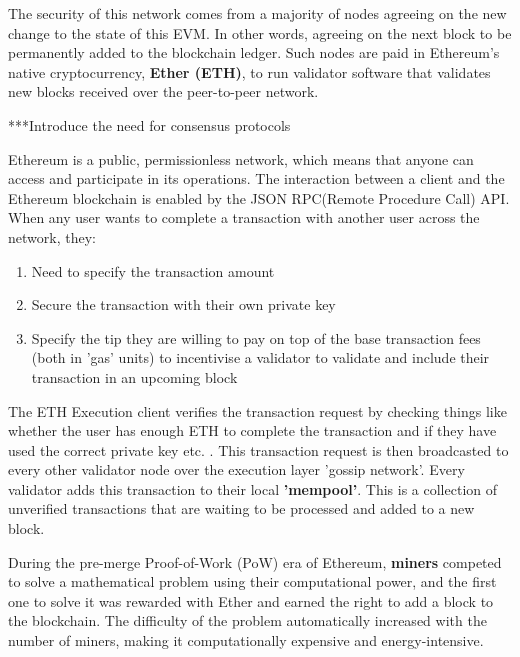 The security of this network comes from a majority of nodes agreeing on the new change to the state of this EVM. In other words, agreeing on the next block to be permanently added to the blockchain ledger. Such nodes are paid in Ethereum's native cryptocurrency, \textbf{Ether (ETH)}, to run validator software that validates new blocks received over the peer-to-peer network.

***Introduce the need for consensus protocols

Ethereum is a public, permissionless network, which means that anyone can access and participate in its operations. The interaction between a client and the Ethereum blockchain is enabled by the JSON RPC(Remote Procedure Call) API. When any user wants to complete a transaction with another user across the network, they:
\begin{enumerate}
    \item Need to specify the transaction amount
    \item Secure the transaction with their own private key
    \item Specify the tip they are willing to pay on top of the base transaction fees (both in 'gas' units) to incentivise a validator to validate and include their transaction in an upcoming block
\end{enumerate}

The ETH Execution client verifies the transaction request by checking things like whether the user has enough ETH to complete the transaction and if they have used the correct private key etc. \cite{EthereumEthereum.org}. 
This transaction request is then broadcasted to every other validator node over the execution layer 'gossip network'. Every validator adds this transaction to their local \textbf{'mempool'}. This is a collection of unverified transactions that are waiting to be processed and added to a new block.

During the pre-merge Proof-of-Work (PoW) era of Ethereum, \textbf{miners} competed to solve a mathematical problem using their computational power, and the first one to solve it was rewarded with Ether and earned the right to add a block to the blockchain. The difficulty of the problem automatically increased with the number of miners, making it computationally expensive and energy-intensive. 


